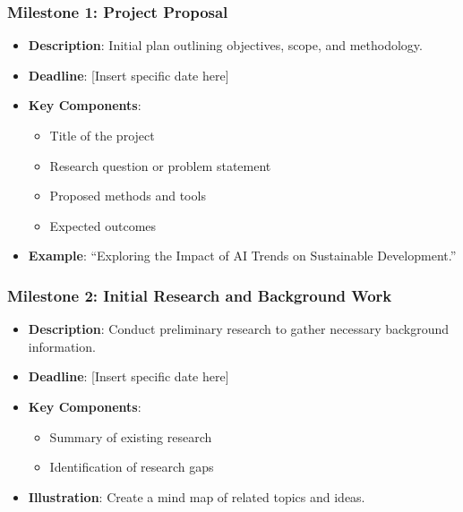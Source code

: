 \documentclass[aspectratio=169]{beamer}
\begin{document}
\begin{frame}[fragile]
    \frametitle{Milestone 1: Project Proposal}
    \begin{itemize}
        \item \textbf{Description}: Initial plan outlining objectives, scope, and methodology.
        \item \textbf{Deadline}: [Insert specific date here]
        \item \textbf{Key Components}:
        \begin{itemize}
            \item Title of the project
            \item Research question or problem statement
            \item Proposed methods and tools
            \item Expected outcomes
        \end{itemize}
        \item \textbf{Example}: “Exploring the Impact of AI Trends on Sustainable Development.”
    \end{itemize}
\end{frame}

\begin{frame}[fragile]
    \frametitle{Milestone 2: Initial Research and Background Work}
    \begin{itemize}
        \item \textbf{Description}: Conduct preliminary research to gather necessary background information.
        \item \textbf{Deadline}: [Insert specific date here]
        \item \textbf{Key Components}:
        \begin{itemize}
            \item Summary of existing research
            \item Identification of research gaps
        \end{itemize}
        \item \textbf{Illustration}: Create a mind map of related topics and ideas.
    \end{itemize}
\end{frame}
\end{document}
